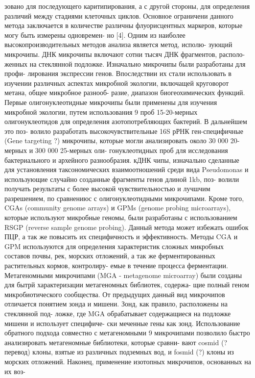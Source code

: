 зовано для последующего каритипирования, а с другой стороны, для определения различий
между стадиями клеточных циклов. Основное ограничени данного метода заключается в
количестве различны флуорисцентных маркеров, которые могу быть измерены одновремен-
но [4].
Одним из наиболее высокопроизводительных методов анализа является метод, исполю-
зующий микрочипы. ДНК микрочипы включают сотни тысяч ДНК фрагментов, располо-
женных на стеклянной подложке. Изначально микрочипы были разработаны для профи-
лирования экспрессии генов. Впоследствии их стали использовать в изучении различных
аспектах микробной экологии, включащей круговорот метана, общее микробное разнооб-
разие, диапазон биогеохимических функций. Первые олигонуклеотидные микрочипы были
применены для изучения микробной экологии, путем использования 9 проб 15-20-мерных
олигонуклеотидов для определения азотопотребляющих бактерий. В дальнейшем это поз-
волило разработать высокочувствительные 16S рРНК ген-специфичные (Gene targeting ?)
микрочипы, которые могли анализировать около 30 000 20-мерных и 300 000 25-мерных оли-
гонуклеотидных проб для исследования бактериального и архейного разнообразия. кДНК
чипы, изначально сделанные для установления таксономических взаимоотношений среди
вида Pseudomonas и использующие случайно созданные фрагменты генов длиной 1kb, поз-
волили получать результаты с более высокой чувствительностью и лучшчим разрешением,
по сравнениюс с олигонуклеотидными микрочипами. Кроме того, CGAs (community genome
arrays) и GPMs (genome probing microarrays), которые используют микробные геномы, были
разработаны с использованием RSGP (reverse sample genome probing). Данный метода может
избежать ошибок ПЦР, а так же повысить их специфичность и эффективность. Методы CGA
и GPM используются для определения характеристик сложных микробных составов почвы,
рек, морских отложений, а так же ферментированных растительных кормов, контролиру-
емые в течение процесса ферментации. Метагеномными микрочипами (MGA - metagenome
microarray) были созданы для бытрй характеризации метагеномных библиотек, содержа-
щие полный геном микробиотического сообщества. От предыдущих данный вид микрочипов
отличается понятием зонда и мишени. Зонд, как правило, расположены на стеклянной под-
ложке, где MGA обрабатывает содержащиеся на подложке мишени и использует специфиче-
ски меченные гены как зонд. Использование обратного подхода совместно с метагеномными
9
микрочипами позволило быстро анализировать метагеномные библиотеки, которые сравни-
вают cosmid (? перевод) клоны, взятые из различных подземных вод, и fosmid (?) клоны
из морских отложений. Наконец, применение изотопных микрочипов, основанных на их воз-
